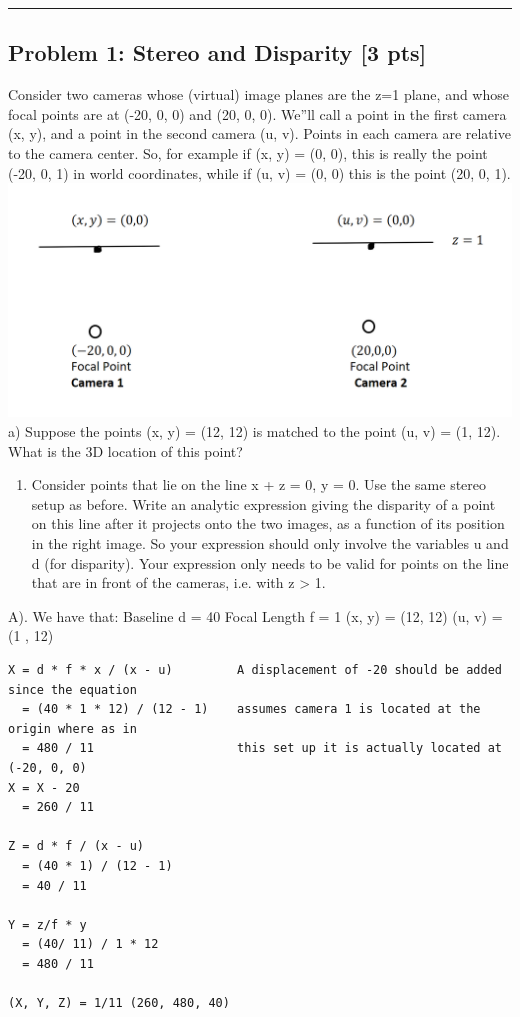 \documentclass[11pt]{article}
\makeatletter
\def\maxwidth{\ifdim\Gin@nat@width>\linewidth\linewidth
    \else\Gin@nat@width\fi}
\let\Oldincludegraphics\includegraphics
\renewcommand{\includegraphics}[1]{\Oldincludegraphics[width=.8\maxwidth]{#1}}
\providecommand{\tightlist}{%
      \setlength{\itemsep}{0pt}\setlength{\parskip}{0pt}}
\makeatother
\begin{document}
\begin{center}\rule{0.5\linewidth}{\linethickness}\end{center}

    \subsection{Problem 1: Stereo and Disparity {[}3
pts{]}}\label{problem-1-stereo-and-disparity-3-pts}

Consider two cameras whose (virtual) image planes are the z=1 plane, and
whose focal points are at (-20, 0, 0) and (20, 0, 0). We''ll call a
point in the first camera (x, y), and a point in the second camera (u,
v). Points in each camera are relative to the camera center. So, for
example if (x, y) = (0, 0), this is really the point (-20, 0, 1) in
world coordinates, while if (u, v) = (0, 0) this is the point (20, 0,
1).\includegraphics{fig/fig1.png} a) Suppose the points (x, y) = (12,
12) is matched to the point (u, v) = (1, 12). What is the 3D location of
this point?

\begin{enumerate}
\def\labelenumi{\alph{enumi})}
\setcounter{enumi}{1}
\tightlist
\item
  Consider points that lie on the line x + z = 0, y = 0. Use the same
  stereo setup as before. Write an analytic expression giving the
  disparity of a point on this line after it projects onto the two
  images, as a function of its position in the right image. So your
  expression should only involve the variables u and d (for disparity).
  Your expression only needs to be valid for points on the line that are
  in front of the cameras, i.e. with z \textgreater{} 1.
\end{enumerate}

    A). We have that: Baseline d = 40 Focal Length f = 1 (x, y) = (12, 12)
(u, v) = (1 , 12)

\begin{verbatim}
X = d * f * x / (x - u)         A displacement of -20 should be added since the equation 
  = (40 * 1 * 12) / (12 - 1)    assumes camera 1 is located at the origin where as in 
  = 480 / 11                    this set up it is actually located at (-20, 0, 0)
X = X - 20
  = 260 / 11

Z = d * f / (x - u)
  = (40 * 1) / (12 - 1)
  = 40 / 11
  
Y = z/f * y
  = (40/ 11) / 1 * 12
  = 480 / 11
  
(X, Y, Z) = 1/11 (260, 480, 40)
\end{verbatim}
\end{document}
